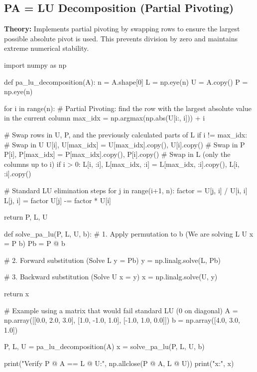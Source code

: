 \documentclass{article}
\begin{document}
\subsection{PA = LU Decomposition (Partial Pivoting)}
\textbf{Theory:} Implements partial pivoting by swapping rows to ensure the largest possible absolute pivot is used. This prevents division by zero and maintains extreme numerical stability.

\begin{jupytercode}
import numpy as np

def pa_lu_decomposition(A):
    n = A.shape[0]
    L = np.eye(n)
    U = A.copy()
    P = np.eye(n)
    
    for i in range(n):
        # Partial Pivoting: find the row with the largest absolute value in the current column
        max_idx = np.argmax(np.abs(U[i:, i])) + i
        
        # Swap rows in U, P, and the previously calculated parts of L
        if i != max_idx:
            # Swap in U
            U[i], U[max_idx] = U[max_idx].copy(), U[i].copy()
            # Swap in P
            P[i], P[max_idx] = P[max_idx].copy(), P[i].copy()
            # Swap in L (only the columns up to i)
            if i > 0:
                L[i, :i], L[max_idx, :i] = L[max_idx, :i].copy(), L[i, :i].copy()
                
        # Standard LU elimination steps
        for j in range(i+1, n):
            factor = U[j, i] / U[i, i]
            L[j, i] = factor
            U[j] -= factor * U[i]
            
    return P, L, U

def solve_pa_lu(P, L, U, b):
    # 1. Apply permutation to b (We are solving L U x = P b)
    Pb = P @ b
    
    # 2. Forward substitution (Solve L y = Pb)
    y = np.linalg.solve(L, Pb)
        
    # 3. Backward substitution (Solve U x = y)
    x = np.linalg.solve(U, y)
        
    return x

# Example using a matrix that would fail standard LU (0 on diagonal)
A = np.array([[0.0, 2.0, 3.0], [1.0, -1.0, 1.0], [-1.0, 1.0, 0.0]])
b = np.array([4.0, 3.0, 1.0])

P, L, U = pa_lu_decomposition(A)
x = solve_pa_lu(P, L, U, b)

print("Verify P @ A == L @ U:\n", np.allclose(P @ A, L @ U))
print("\nSolution x:", x)
\end{jupytercode}
\newpage
\end{document}
